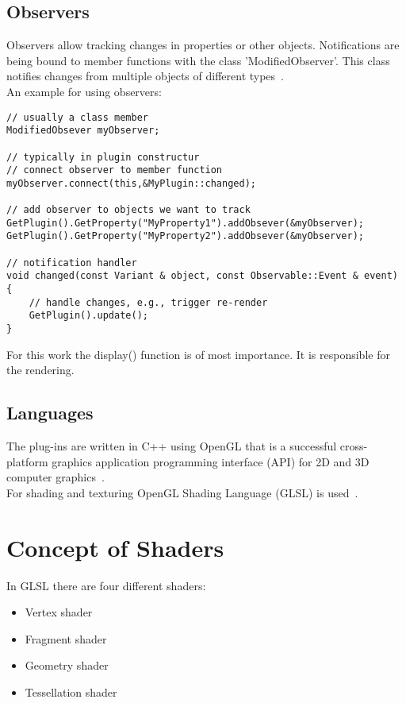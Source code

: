 \subsection{Observers}
\label{chap:observers}
Observers allow tracking changes in properties or other objects. Notifications are being bound to member functions with the class 'ModifiedObserver'. This class notifies changes from multiple objects of different types~\cite{misc:volumeshop101}.\\
An example for using observers:
\begin{lstlisting}
// usually a class member
ModifiedObsever myObserver;

// typically in plugin constructur
// connect observer to member function
myObserver.connect(this,&MyPlugin::changed);

// add observer to objects we want to track
GetPlugin().GetProperty("MyProperty1").addObsever(&myObserver);
GetPlugin().GetProperty("MyProperty2").addObsever(&myObserver);

// notification handler
void changed(const Variant & object, const Observable::Event & event)
{
	// handle changes, e.g., trigger re-render
	GetPlugin().update();
}
\end{lstlisting}

For this work the display() function is of most importance. It is responsible for the rendering.

\subsection{Languages}
The plug-ins are written in C++ using OpenGL that is a successful cross-platform graphics application programming interface (API) for 2D and 3D computer graphics~\cite{book:computerGraphicsHill}.\\ %
For shading and texturing OpenGL Shading Language (GLSL) is used~\cite{misc:volumeshop101}.

\section{Concept of Shaders}

In GLSL there are four different shaders:
\begin{itemize}
	\item Vertex shader
	\item Fragment shader
	\item Geometry shader
	\item Tessellation shader
\end{itemize}

